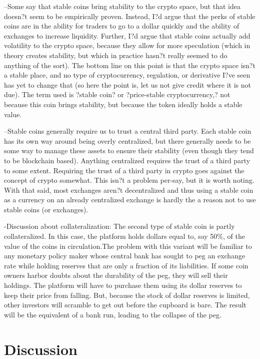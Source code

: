 --Some say that stable coins bring stability to the crypto space, but that idea doesn?t seem to be empirically proven. Instead, I?d argue that the perks of stable coins are in the ability for traders to go to a dollar quickly and the ability of exchanges to increase liquidity. Further, I?d argue that stable coins actually add volatility to the crypto space, because they allow for more speculation (which in theory creates stability, but which in practice hasn?t really seemed to do anything of the sort). The bottom line on this point is that the crypto space isn?t a stable place, and no type of cryptocurrency, regulation, or derivative I?ve seen has yet to change that (so here the point is, let us not give credit where it is not due). The term used is ?stable coin? or ?price-stable cryptocurrency,? not because this coin brings stability, but because the token ideally holds a stable value.

--Stable coins generally require us to trust a central third party. Each stable coin has its own way around being overly centralized, but there generally needs to be some way to manage these assets to ensure their stability (even though they tend to be blockchain based). Anything centralized requires the trust of a third party to some extent. Requiring the trust of a third party in crypto goes against the concept of crypto somewhat. This isn?t a problem per-say, but it is worth noting. With that said, most exchanges aren?t decentralized and thus using a stable coin as a currency on an already centralized exchange is hardly the a reason not to use stable coins (or exchanges).

-Discussion about collateralization: The second type of stable coin is partly collateralized. In this case, the platform holds dollars equal to, say 50\%, of the value of the coins in circulation.The problem with this variant will be familiar to any monetary policy maker whose central bank has sought to peg an exchange rate while holding reserves that are only a fraction of its liabilities.
If some coin owners harbor doubts about the durability of the peg, they will sell their holdings. The platform will have to purchase them using its dollar reserves to keep their price from falling. But, because the stock of dollar reserves is limited, other investors will scramble to get out before the cupboard is bare. The result will be the equivalent of a bank run, leading to the collapse of the peg.

\section{Discussion}

